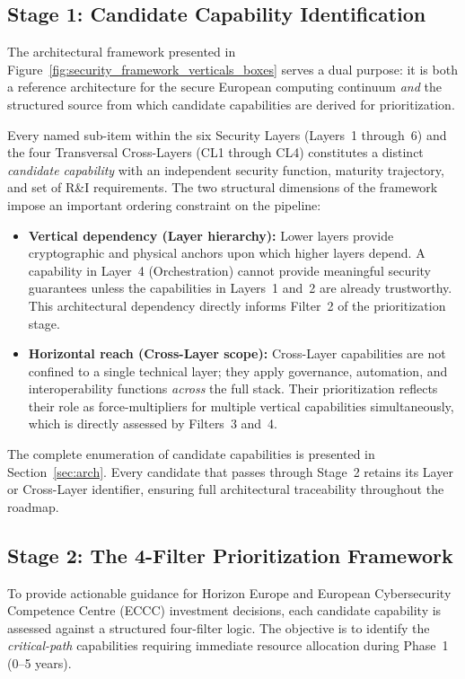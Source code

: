 \documentclass{ieeeaccess}
\begin{document}
\subsection{Stage 1: Candidate Capability Identification}
\label{sec:capability_identification}
The architectural framework presented in
Figure~\ref{fig:security_framework_verticals_boxes} serves a dual purpose:
it is both a reference architecture for the secure European computing
continuum \emph{and} the structured source from which candidate capabilities
are derived for prioritization.

Every named sub-item within the six Security Layers (Layers~1 through~6) and
the four Transversal Cross-Layers (CL1 through CL4) constitutes a distinct
\emph{candidate capability} with an independent security function, maturity
trajectory, and set of R\&I requirements. The two structural dimensions of
the framework impose an important ordering constraint on the pipeline:

\begin{itemize}
    \item \textbf{Vertical dependency (Layer hierarchy):} Lower layers provide
    cryptographic and physical anchors upon which higher layers depend. A
    capability in Layer~4 (Orchestration) cannot provide meaningful security
    guarantees unless the capabilities in Layers~1 and~2 are already
    trustworthy. This architectural dependency directly informs Filter~2
    of the prioritization stage.

    \item \textbf{Horizontal reach (Cross-Layer scope):} Cross-Layer
    capabilities are not confined to a single technical layer; they apply
    governance, automation, and interoperability functions \emph{across} the
    full stack. Their prioritization reflects their role as force-multipliers
    for multiple vertical capabilities simultaneously, which is directly
    assessed by Filters~3 and~4.
\end{itemize}

The complete enumeration of candidate capabilities is presented in
Section~\ref{sec:arch}. Every candidate that passes through Stage~2
retains its Layer or Cross-Layer identifier, ensuring full architectural
traceability throughout the roadmap.

\subsection{Stage 2: The 4-Filter Prioritization Framework}
\label{sec:filters}
To provide actionable guidance for Horizon Europe and European Cybersecurity
Competence Centre (ECCC) investment decisions, each candidate capability is
assessed against a structured four-filter logic. The objective is to identify
the \emph{critical-path} capabilities requiring immediate resource allocation
during Phase~1 (0--5 years).
\end{document}
